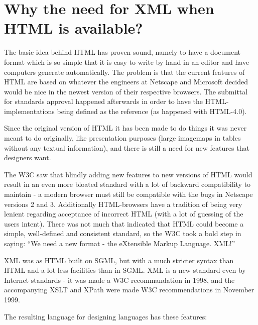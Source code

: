 \section{Why the need for XML when HTML is available?}

The basic idea behind HTML has proven sound, namely to have a document
format which is so simple that it is easy to write by hand in an
editor and have computers generate automatically. The problem is that
the current features of HTML are based on whatever the engineers at
Netscape and Microsoft decided would be nice in the newest version of
their respective browsers.  The submittal for standards approval
happened afterwards in order to have the HTML-implementations being
defined as the reference (as happened with HTML-4.0).

Since the original version of HTML it has been made to do things it
was never meant to do originally, like presentation purposes (large
imagemaps in tables without any textual information), and there is
still a need for new features that designers want.

The W3C saw that blindly adding new features to new
versions of HTML would result in an even more bloated standard with a
lot of backward compatibility to maintain - a modern browser must
still be compatible with the bugs in Netscape versions 2 and 3.
Additionally HTML-browsers have a tradition of being very lenient
regarding acceptance of incorrect HTML (with a lot of guessing of the
users intent).  There was not much that indicated that HTML could
become a simple, well-defined and consistent standard, so the W3C took
a bold step in saying: ``We need a new format - the eXtensible Markup
Language.  XML!''

XML was as HTML built on SGML, but with a much stricter syntax than
HTML and a lot less facilities than in SGML.  XML is a new standard
even by Internet standards - it was made a W3C recommandation in 1998,
and the accompanying XSLT and XPath were made W3C recommendations in
November 1999.  


The resulting language for designing languages has these features:


